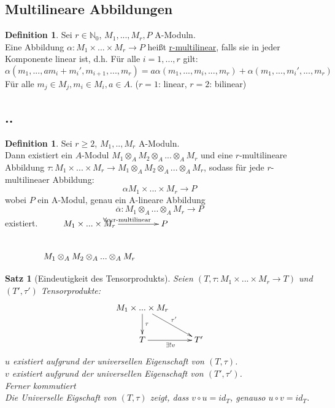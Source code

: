 \documentclass[10pt,a4paper]{article}
\newcommand{\N}{\ensuremath{\mathbb{N}}}
\newcommand{\al}{\ensuremath{\alpha}}
\newcommand{\ol}[1]{\overline{#1}}
\newcounter{thm}[section]
\theoremstyle{definition}
\newtheorem{definition}[thm]{Definition}
\theoremstyle{plain}
\newtheorem{satz}[thm]{Satz}
\theoremstyle{remark}
\begin{document}
\subsection{Multilineare Abbildungen}
\begin{definition}
	Sei $r\in \N_0$, $M_1,...,M_r,P$ A-Moduln.\\
	Eine Abbildung $\al:M_1\times...\times M_r\rightarrow P$ heißt \underline{r-multilinear}, falls sie in jeder Komponente linear ist, d.h. Für alle $i=1,...,r$ gilt:
	\[\al(m_1,...,am_{i}+m_i',m_{i+1},...,m_r)=a\al(m_1,...,m_i,...,m_r)+\al(m_1,...,m_i',...,m_r)\]
	Für alle $m_j\in M_j,m_i\in M_i,a\in A$.
	($r=1$: linear, $r=2$: bilinear)
\end{definition}
\subsection{..}
\begin{definition}
	Sei $r\ge 2$, $M_1,..,M_r$ A-Moduln.\\
	Dann existiert ein $A$-Modul $M_1\otimes_AM_2\otimes_A...\otimes_AM_r$ und eine $r$-multilineare Abbildung $\tau:M_1\times...\times M_r\rightarrow M_1\otimes_AM_2\otimes_A...\otimes_AM_r$, sodass für jede $r$-multilineaer Abbildung:
	\[\al M_1\times...\times M_r\rightarrow P\]
	wobei $P$ ein A-Modul, genau ein A-lineare Abbildung 
	\[\ol\al:M_1\otimes_A...\otimes_AM_r\rightarrow P\]
	existiert.
	$\xymatrix{
		M_1\times...\times M_r \ar[r]^{\forall\al: \text{r-multilinear}} & P\\
		M_1\otimes_AM_2\otimes_A...\otimes_AM_r&
	}$
\end{definition}
\begin{satz}[Eindeutigkeit des Tensorprodukts]
	Seien $(T,\tau:M_1\times...\times M_r\rightarrow T)$ und $(T',\tau')$ Tensorprodukte:
	\[\xymatrix{ 
		M_1\times...\times M_r \ar[d]^{\tau} \ar[dr]^{\tau'}&\\
		T\ar[r]_{\exists!v}&T'
	}\]
	$u$ existiert aufgrund der universellen Eigenschaft von $(T,\tau)$.\\
	$v$ existiert aufgrund der universellen Eigenschaft von $(T',\tau')$.\\
	Ferner kommutiert\\
	
	Die Universelle Eigschaft von $(T,\tau)$ zeigt, dass $v\circ u=id_T$, genauso $u\circ v=id_T$.
\end{satz}
\end{document}
